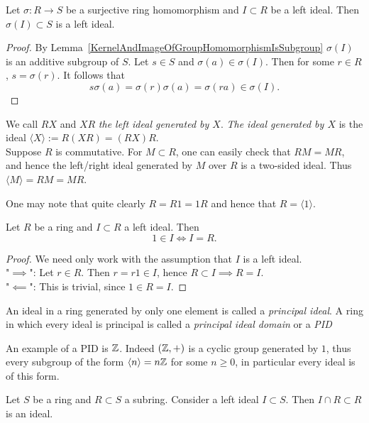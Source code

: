 \begin{lemma}\label{ImageOfSurjectiveRingHomOfIdealIsIdeal}
    Let $\sigma : R \rightarrow S$ be a surjective ring homomorphism and $I\subset R$ be a left ideal. Then $\sigma(I)\subset S$ is a left ideal. 
\end{lemma}
\begin{proof}
     By Lemma~\ref{KernelAndImageOfGroupHomomorphismIsSubgroup} $\sigma(I)$ is an additive subgroup of $S$. Let $s\in S$ and $\sigma(a)\in \sigma(I)$. Then for some $r\in R$, $s = \sigma(r)$. It follows that 
     $$s\sigma(a) = \sigma(r)\sigma(a)=\sigma(ra)\in \sigma(I).$$
\end{proof}
\begin{remark}
    We call $RX$ and $XR$ \textit{the left ideal generated by $X$}. \textit{The ideal generated by $X$} is the ideal $\langle X\rangle := R(XR) = (RX)R$.\\ 
    Suppose $R$ is commutative. For $M\subset R$, one can easily check that $RM =MR$, and hence the left/right ideal generated by $M$ over $R$ is a two-sided ideal. Thus $\langle M\rangle = RM = MR$. 
\end{remark}
\begin{example}
    One may note that quite clearly $R = R1=1R$ and hence that $R= \langle 1\rangle$.
\end{example}
\begin{lemma}\label{IdealIsNonProperIff1IsInIdeal}
    Let $R$ be a ring and $I\subset R$ a left ideal. Then 
    $$1\in I \iff I = R.$$
\end{lemma}
\begin{proof}
    We need only work with the assumption that $I$ is a left ideal.\\ 
    "$\implies$": Let $r \in R$. Then $r=r1\in I$, hence $R\subset I\implies R=I$.\\
    "$\impliedby$": This is trivial, since $1\in R = I$.
\end{proof}
\begin{definition}
    An ideal in a ring generated by only one element is called a \textit{principal ideal}. A ring in which every ideal is principal is called a \textit{principal ideal domain} or a \textit{PID}
\end{definition}
An example of a PID is $\mathbb{Z}$. Indeed $(\mathbb{Z},+)$ is a cyclic group generated by $1$, thus every subgroup of the form $\langle n\rangle = n\mathbb{Z}$ for some $n\geq 0$, in particular every ideal is of this form. 
\begin{proposition}\label{EliminationIdeal}
    Let $S$ be a ring and $R\subset S$ a subring. Consider a left ideal $I\subset S$. Then $I\cap R\subset R$ is an ideal.
\end{proposition}
